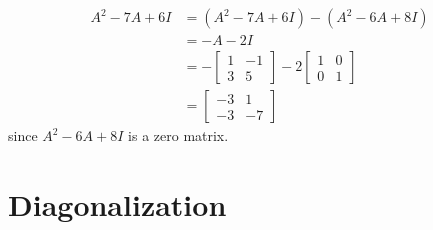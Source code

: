 \begin{exmp}
\begin{align*}
A^2 - 7A + 6I &= (A^2 - 7A + 6I) - (A^2 - 6A + 8I) \\
&= -A-2I \\
&= -\begin{bmatrix}
1 & -1 \\
3 & 5
\end{bmatrix} 
-2
\begin{bmatrix}
1 & 0 \\
0 & 1
\end{bmatrix} \\
&=
\begin{bmatrix}
-3 & 1 \\
-3 & -7
\end{bmatrix}
\end{align*}
since $A^2 - 6A + 8I$ is a zero matrix.
\end{exmp}

\section{Diagonalization}

